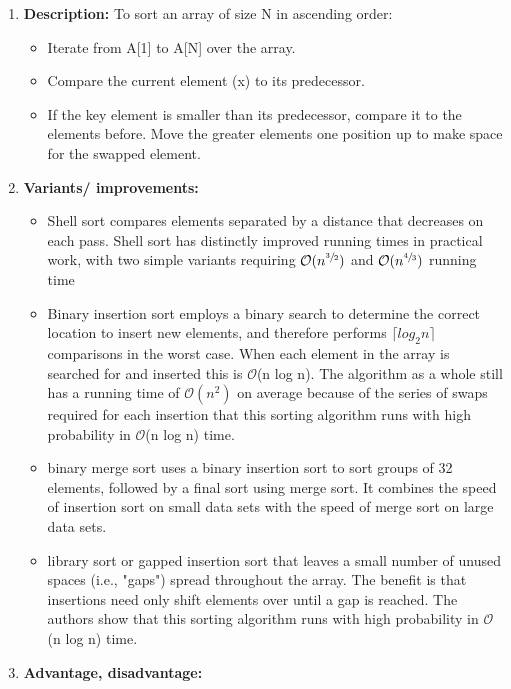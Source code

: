 \documentclass[11pt,a4paper]{article}
\begin{document}
{\begin{enumerate}[label=\textbf{\arabic*})]
				\item \textbf{Description:}
					To sort an array of size N in ascending order: 
						\begin{itemize}
							\item Iterate from A[1] to A[N] over the array. 
							\item Compare the current element (x) to its predecessor. 
							\item If the key element is smaller than its predecessor, compare it to the elements before. Move the greater elements one position up to make space for the swapped element.
						\end{itemize}
				\item \textbf{Variants/ improvements:}
					\begin{itemize}
						\item Shell sort compares elements separated by a distance that decreases on each pass. Shell sort has distinctly improved running times in practical work, with two simple variants requiring $\mathcal{O}(n^{\sfrac{3}{2}})$ and $\mathcal{O}(n^{\sfrac{4}{3}})$ running time
						\item Binary insertion sort employs a binary search to determine the correct location to insert new elements, and therefore performs $\lceil log_{2}n \rceil$ comparisons in the worst case. When each element in the array is searched for and inserted this is $\mathcal{O}$(n log n). The algorithm as a whole still has a running time of $\mathcal{O}(n^2)$ on average because of the series of swaps required for each insertion
						that this sorting algorithm runs with high probability in $\mathcal{O}$(n log n) time.
						\item binary merge sort uses a binary insertion sort to sort groups of 32 elements, followed by a final sort using merge sort. It combines the speed of insertion sort on small data sets with the speed of merge sort on large data sets.
						\item library sort or gapped insertion sort that leaves a small number of unused spaces (i.e., "gaps") spread throughout the array. The benefit is that insertions need only shift elements over until a gap is reached. The authors show that this sorting algorithm runs with high probability in $\mathcal{O}$(n log n) time.
					\end{itemize}
				\item \textbf{Advantage, disadvantage:}
					\begin{table}[ht]
						\centering
						\begin{tabular}{|p{8cm}|p{8cm}|}

\end{tabular}
\end{table}
\end{enumerate}}
\end{document}

